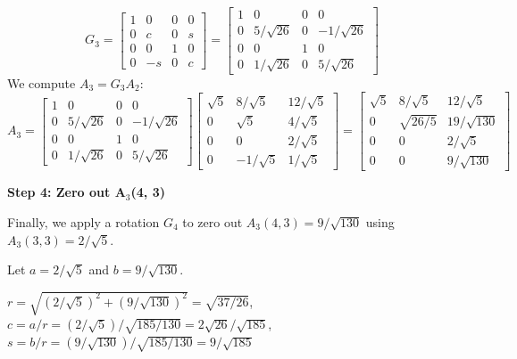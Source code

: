 \documentclass{article}
\newcommand{\0}{{\mathbf{0}}} %
\begin{document}
$$ G_3 =
\begin{bmatrix} 1 & 0 & 0 & 0 \\ 0 & c & 0 & s \\ 0 & 0 & 1 & 0 \\ 0 & -s & 0 & c
\end{bmatrix} =
\begin{bmatrix} 1 & 0 & 0 & 0 \\ 0 & 5/\sqrt{26} & 0 & -1/\sqrt{26} \\ 0 & 0 & 1 & 0 \\ 0 & 1/\sqrt{26} & 0 & 5/\sqrt{26}
\end{bmatrix} $$
We compute $A_3 = G_3 A_2$:
$$ A_3 =
\begin{bmatrix} 1 & 0 & 0 & 0 \\ 0 & 5/\sqrt{26} & 0 & -1/\sqrt{26} \\ 0 & 0 & 1 & 0 \\ 0 & 1/\sqrt{26} & 0 & 5/\sqrt{26}
\end{bmatrix}
\begin{bmatrix} \sqrt{5} & 8/\sqrt{5} & 12/\sqrt{5} \\ 0 & \sqrt{5} & 4/\sqrt{5} \\ 0 & 0 & 2/\sqrt{5} \\ 0 & -1/\sqrt{5} & 1/\sqrt{5}
\end{bmatrix} =
\begin{bmatrix} \sqrt{5} & 8/\sqrt{5} & 12/\sqrt{5} \\ 0 & \sqrt{26/5} & 19/\sqrt{130} \\ 0 & 0 & 2/\sqrt{5} \\ 0 & 0 & 9/\sqrt{130}
\end{bmatrix} $$

\textbf{Step 4: Zero out A\(_3\)(4, 3)}

Finally, we apply a rotation $G_4$ to zero out $A_3(4, 3) = 9/\sqrt{130}$ using $A_3(3, 3) = 2/\sqrt{5}$.

Let $a = 2/\sqrt{5}$ and $b = 9/\sqrt{130}$.

$r = \sqrt{(2/\sqrt{5})^2 + (9/\sqrt{130})^2} = \sqrt{37/26}$,
$c = a/r = (2/\sqrt{5}) / \sqrt{185/130} = 2\sqrt{26}/\sqrt{185}$,
$s = b/r = (9/\sqrt{130}) / \sqrt{185/130} = 9/\sqrt{185}$
\end{document}
